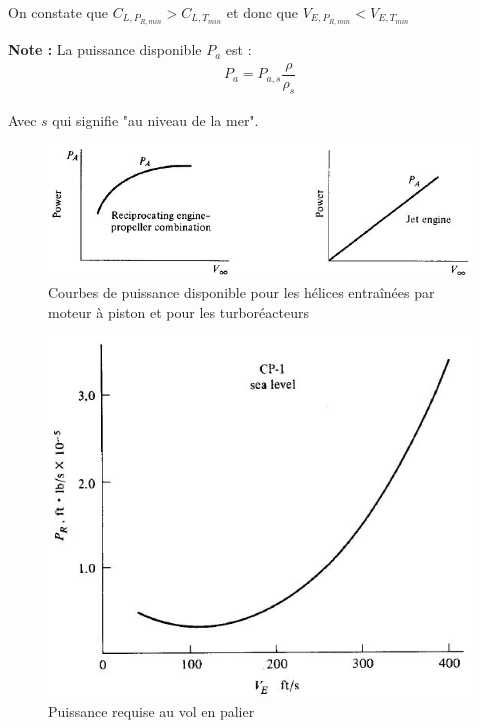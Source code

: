 \documentclass{report}
\begin{document}
On constate que $C_{L,P_{R,min}}>C_{L,T_{min}}$ et donc que $V_{E,P_{R,min}}<V_{E,T_{min}}$

\textbf{Note :} La puissance disponible $P_a$ est : 
\begin{eqnarray}
P_a=P_{a,s} \dfrac{\rho}{\rho_s}
\end{eqnarray}

Avec $s$ qui signifie "au niveau de la mer".

\begin{figure}[h!]
    \centering
    \includegraphics[scale=0.7]{9.JPG}
    \caption{Courbes de puissance disponible pour les hélices entraînées par moteur
à piston et pour les turboréacteurs}
    \label{9}
\end{figure}

\begin{figure}[h!]
    \centering
    \includegraphics[scale=0.8]{10.JPG}
    \caption{Puissance requise au vol en palier}
    \label{10}
\end{figure}
\end{document}
